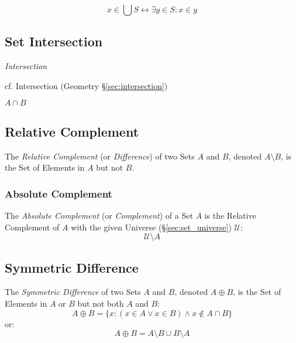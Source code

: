 \[
  x \in \bigcup S \leftrightarrow \exists y \in S : x \in y
\]



\subsection{Set Intersection}\label{sec:set_intersection}

\emph{Intersection}

\fist cf. Intersection (Geometry \S\ref{sec:intersection})

$A \cap B$



\subsection{Relative Complement}\label{sec:relative_complement}

The \emph{Relative Complement} (or \emph{Difference}) of two Sets $A$
and $B$, denoted $A \setminus B$, is the Set of Elements in $A$ but
not $B$.



\subsubsection{Absolute Complement}\label{sec:absolute_complement}

The \emph{Absolute Complement} (or \emph{Complement}) of a Set $A$ is
the Relative Complement of $A$ with the given Universe
(\S\ref{sec:set_universe}) $\mathcal{U}$:
\[
  \mathcal{U} \setminus A
\]



\subsection{Symmetric Difference}\label{sec:symmetric_difference}

The \emph{Symmetric Difference} of two Sets $A$ and $B$, denoted $A
\oplus B$, is the Set of Elements in $A$ or $B$ but not both $A$ and
$B$:
\[
  A \oplus B =
  \{ x : (x \in A \vee x \in B) \wedge x \notin A \cap B \}
\]
or:
\[
  A \oplus B = A \setminus B \cup B \setminus A
\]



